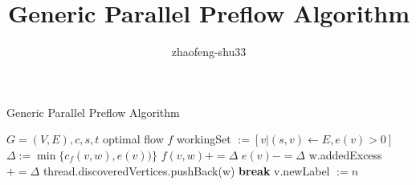 \documentclass{article}
\title{Generic Parallel Preflow Algorithm}
\author{zhaofeng-shu33}
\begin{document}
\maketitle
\begin{algorithm}
\caption{Generic Parallel Preflow Algorithm}
\begin{algorithmic}[1]
\REQUIRE $G=(V,E),c,s,t$
\ENSURE optimal flow $f$
\STATE workingSet $:=[v | (s, v) \leftarrow E, e(v) > 0]$
\STATE $\Delta := \min\{c_f(v, w), e(v))\}$
\STATE $f(v, w) += \Delta$
\STATE $e(v) -= \Delta$
\STATE w.addedExcess $+= \Delta$
\STATE thread.discoveredVertices.pushBack(w)
\ENDIF
\ENDIF
{}
\STATE \textbf{break}
\ENDIF
\ENDFOR
\ENDFOR
{}
\STATE v.newLabel $:= n$
\ENDIF
\ENDFOR
\ENDWHILE
\end{algorithmic}
\end{algorithm}
\end{document}
